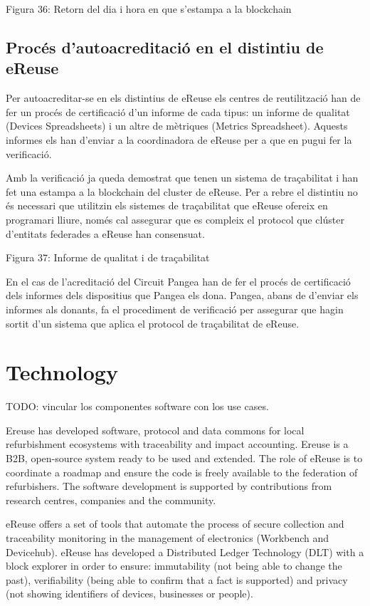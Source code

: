 \documentclass[
]{book}
\begin{document}
Figura 36: Retorn del dia i hora en que s'estampa a la blockchain

\hypertarget{procuxe9s-dautoacreditaciuxf3-en-el-distintiu-de-ereuse}{%
\section{Procés d'autoacreditació en el distintiu de eReuse}\label{procuxe9s-dautoacreditaciuxf3-en-el-distintiu-de-ereuse}}

Per autoacreditar-se en els distintius de eReuse els centres de reutilització han de fer un procés de certificació d'un informe de cada tipus: un informe de qualitat (Devices Spreadsheets) i un altre de mètriques (Metrics Spreadsheet). Aquests informes els han d'enviar a la coordinadora de eReuse per a que en pugui fer la verificació.

Amb la verificació ja queda demostrat que tenen un sistema de traçabilitat i han fet una estampa a la blockchain del cluster de eReuse. Per a rebre el distintiu no és necessari que utilitzin els sistemes de traçabilitat que eReuse ofereix en programari lliure, només cal assegurar que es compleix el protocol que clúster d'entitats federades a eReuse han consensuat.

Figura 37: Informe de qualitat i de traçabilitat

En el cas de l'acreditació del Circuit Pangea han de fer el procés de certificació dels informes dels dispositius que Pangea els dona. Pangea, abans de d'enviar els informes als donants, fa el procediment de verificació per assegurar que hagin sortit d'un sistema que aplica el protocol de traçabilitat de eReuse.

\hypertarget{technology}{%
\chapter{Technology}\label{technology}}

TODO: vincular los componentes software con los use cases.

Ereuse has developed software, protocol and data commons for local refurbishment ecosystems with traceability and impact accounting. Ereuse is a B2B, open-source system ready to be used and extended. The role of eReuse is to coordinate a roadmap and ensure the code is freely available to the federation of refurbishers. The software development is supported by contributions from research centres, companies and the community.

eReuse offers a set of tools that automate the process of secure collection and traceability monitoring in the management of electronics (Workbench and Devicehub). eReuse has developed a Distributed Ledger Technology (DLT) with a block explorer in order to ensure: immutability (not being able to change the past), verifiability (being able to confirm that a fact is supported) and privacy (not showing identifiers of devices, businesses or people).
\end{document}
